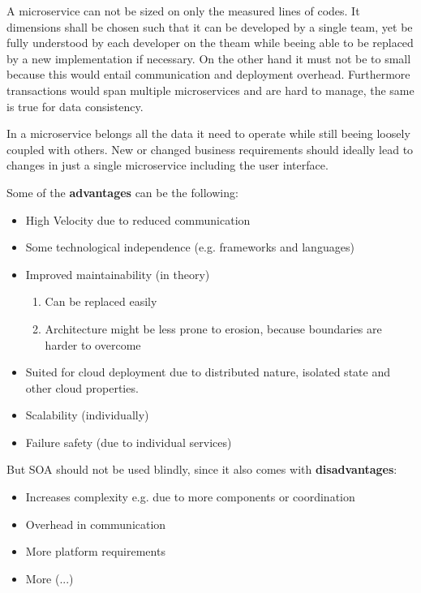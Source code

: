 \documentclass[../Main.tex]{subfiles}
\begin{document}
A microservice can not be sized on only the measured lines of codes.
It dimensions shall be chosen such that it can be developed by a single team, yet be
fully understood by each developer on the theam while beeing able to be replaced by a new implementation if necessary.
On the other hand it must not be to small because this would entail communication and deployment overhead.
Furthermore transactions would span multiple microservices and are hard to manage, the same is true for data consistency.

In a microservice belongs all the data it need to operate while still beeing loosely coupled with others.
New or changed business requirements should ideally lead to changes in just a single microservice including the user interface.

\begin{multicols}{2}
    Some of the \textbf{advantages} can be the following:
    \begin{itemize}
        \item High Velocity due to reduced communication
        \item Some technological independence (e.g. frameworks and languages)
        \item Improved maintainability (in theory)
        \begin{enumerate}
            \item Can be replaced easily
            \item Architecture might be less prone to erosion, because boundaries are harder to overcome
        \end{enumerate}
        \item Suited for cloud deployment due to distributed nature, isolated state and other cloud properties.
        \item Scalability (individually)
        \item Failure safety (due to individual services)
    \end{itemize}
    \columnbreak
    But SOA should not be used blindly, since it also comes with \textbf{disadvantages}:
    \begin{itemize}
        \item Increases complexity e.g. due to more components or coordination
        \item Overhead in communication
        \item More platform requirements
        \item More (...)
    \end{itemize}
\end{multicols}
\end{document}
